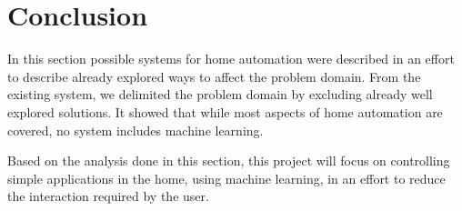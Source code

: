 \section{Conclusion}
In this section possible systems for home automation were described in an effort to describe already explored ways to affect the problem domain. From the existing system, we delimited the problem domain by excluding already well explored solutions. It showed that while most aspects of home automation are covered, no system includes machine learning.

Based on the analysis done in this section, this project will focus on controlling simple applications in the home, using machine learning, in an effort to reduce the interaction required by the user.
